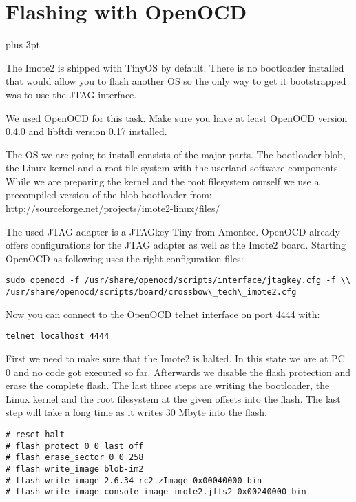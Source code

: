 \chapter{Flashing with OpenOCD}
\label{annexopenocd}
\parindent=0pt                   %
\parskip=6pt plus 3pt            %

The Imote2 is shipped with TinyOS by default. There is no bootloader installed
that would allow you to flash another OS so the only way to get it bootstrapped
was to use the JTAG interface.

We used OpenOCD for this task. Make sure you have at least OpenOCD version 0.4.0
and libftdi version 0.17 installed.

The OS we are going to install consists of the major parts. The bootloader blob, the
Linux kernel and a root file system with the userland software components. While
we are preparing the kernel and the root filesystem ourself we use a
precompiled version of the blob bootloader from:
http://sourceforge.net/projects/imote2-linux/files/

The used JTAG adapter is a JTAGkey Tiny from Amontec. OpenOCD already offers
configurations for the JTAG adapter as well as the Imote2 board. Starting
OpenOCD as following uses the right configuration files:

\begin{verbatim}
sudo openocd -f /usr/share/openocd/scripts/interface/jtagkey.cfg -f \\
/usr/share/openocd/scripts/board/crossbow\_tech\_imote2.cfg
\end{verbatim}

Now you can connect to the OpenOCD telnet interface on port 4444 with:

\begin{verbatim}
telnet localhost 4444
\end{verbatim}

First we need to make sure that the Imote2 is halted. In this state we are at PC
0 and no code got executed so far. Afterwards we disable the flash protection and
erase the complete flash. The last three steps are writing the bootloader, the
Linux kernel and the root filesystem at the given offsets into the flash. The last
step will take a long time as it writes 30 Mbyte into the flash.

\begin{verbatim}
# reset halt
# flash protect 0 0 last off
# flash erase_sector 0 0 258
# flash write_image blob-im2
# flash write_image 2.6.34-rc2-zImage 0x00040000 bin
# flash write_image console-image-imote2.jffs2 0x00240000 bin
\end{verbatim}
